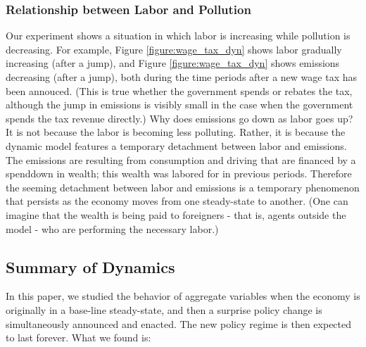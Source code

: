 \documentclass[letter, 12pt, epsf,leqno]{article}
\begin{document}
\subsubsection{Relationship between Labor and Pollution}

Our experiment shows a situation in which labor is increasing while pollution is decreasing.  For example, Figure \ref{figure:wage_tax_dyn} shows labor gradually increasing (after a jump), and Figure \ref{figure:wage_tax_dyn} shows emissions decreasing (after a jump), both during the time periods after a new wage tax has been annouced.  (This is true whether the government spends or rebates the tax, although the jump in emissions is visibly small in the case when the government spends the tax revenue directly.)  Why does emissions go down as labor goes up?  It is not because the labor is becoming less polluting.  Rather, it is because the dynamic model features a temporary detachment between labor and emissions.  The emissions are resulting from consumption and driving that are financed by a spenddown in wealth; this wealth was labored for in previous periods.  Therefore the seeming detachment between labor and emissions is a temporary phenomenon that persists as the economy moves from one steady-state to another.  (One can imagine that the wealth is being paid to foreigners - that is, agents outside the model - who are performing the necessary labor.)



\subsection{Summary of Dynamics}

In this paper, we studied the behavior of aggregate variables when the economy is originally in a base-line steady-state, and then a surprise policy change is simultaneously announced and enacted.  The new policy regime is then expected to last forever.  What we found is:
\end{document}
